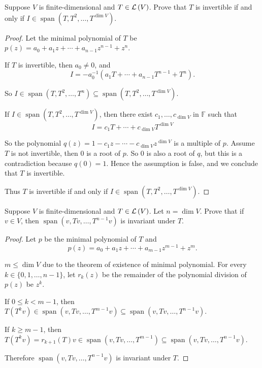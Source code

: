 \begin{exercise}
    Suppose $V$ is finite-dimensional and $T\in\mathcal{L}\left({V}\right)$. Prove that $T$ is invertible if and only if $I\in\operatorname{span}(T, T^{2}, \ldots, T^{\dim V})$.
\end{exercise}

\begin{proof}
    Let the minimal polynomial of $T$ be $p(z) = a_{0} + a_{1}z + \cdots + a_{n-1}z^{n-1} + z^{n}$.

    If $T$ is invertible, then $a_{0}\ne 0$, and
    \[
        I = -a_{0}^{-1}(a_{1}T + \cdots + a_{n-1}T^{n-1} + T^{n}).
    \]

    So $I\in\operatorname{span}(T, T^{2}, \ldots, T^{n})\subseteq \operatorname{span}(T, T^{2}, \ldots, T^{\dim V})$.

    \bigskip
    If $I\in\operatorname{span}(T, T^{2}, \ldots, T^{\dim V})$, then there exist $c_{1}, \ldots, c_{\dim V}$ in $\mathbb{F}$ such that
    \[
        I = c_{1}T + \cdots + c_{\dim V}T^{\dim V}
    \]

    So the polynomial $q(z) = 1 - c_{1}z - \cdots - c_{\dim V}z^{\dim V}$ is a multiple of $p$. Assume $T$ is not invertible, then $0$ is a root of $p$. So $0$ is also a root of $q$, but this is a contradiction because $q(0) = 1$. Hence the assumption is false, and we conclude that $T$ is invertible.

    Thus $T$ is invertible if and only if $I\in\operatorname{span}(T, T^{2}, \ldots, T^{\dim V})$.
\end{proof}
\newpage

\begin{exercise}
    Suppose $V$ is finite-dimensional and $T\in\mathcal{L}\left({V}\right)$. Let $n = \dim V$. Prove that if $v\in V$, then $\operatorname{span}(v, Tv, \ldots, T^{n-1}v)$ is invariant under $T$.
\end{exercise}

\begin{proof}
    Let $p$ be the minimal polynomial of $T$ and
    \[
        p(z) = a_{0} + a_{1}z + \cdots + a_{m-1}z^{m-1} + z^{m}.
    \]

    $m\leq\dim V$ due to the theorem of existence of minimal polynomial. For every $k\in\{0,1,\ldots,n-1\}$, let $r_{k}(z)$ be the remainder of the polynomial division of $p(z)$ be $z^{k}$.

    If $0\leq k < m-1$, then $T(T^{k}v)\in\operatorname{span}(v, Tv, \ldots, T^{m-1}v)\subseteq\operatorname{span}(v, Tv, \ldots, T^{n-1}v)$.

    If $k\geq m-1$, then $T(T^{k}v) = r_{k+1}(T)v\in\operatorname{span}(v, Tv, \ldots, T^{m-1})\subseteq\operatorname{span}(v, Tv, \ldots, T^{n-1}v)$.

    Therefore $\operatorname{span}(v, Tv, \ldots, T^{n-1}v)$ is invariant under $T$.
\end{proof}
\newpage

